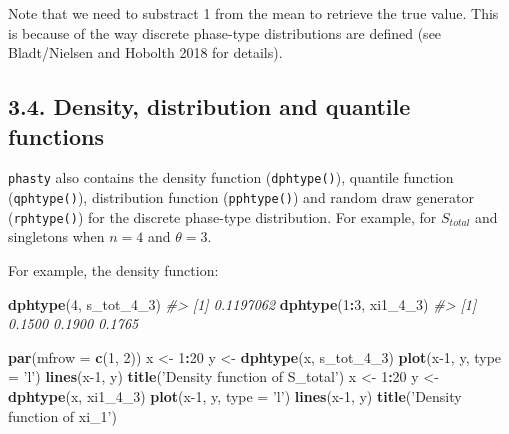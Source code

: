 \documentclass[]{article}
\newenvironment{Shaded}{\begin{snugshade}}{\end{snugshade}}
\newcommand{\CommentTok}[1]{\textcolor[rgb]{0.56,0.35,0.01}{\textit{#1}}}
\newcommand{\DataTypeTok}[1]{\textcolor[rgb]{0.13,0.29,0.53}{#1}}
\newcommand{\DecValTok}[1]{\textcolor[rgb]{0.00,0.00,0.81}{#1}}
\newcommand{\KeywordTok}[1]{\textcolor[rgb]{0.13,0.29,0.53}{\textbf{#1}}}
\newcommand{\NormalTok}[1]{#1}
\newcommand{\OperatorTok}[1]{\textcolor[rgb]{0.81,0.36,0.00}{\textbf{#1}}}
\newcommand{\StringTok}[1]{\textcolor[rgb]{0.31,0.60,0.02}{#1}}
\begin{document}
Note that we need to substract 1 from the mean to retrieve the true
value. This is because of the way discrete phase-type distributions are
defined (see Bladt/Nielsen and Hobolth 2018 for details).

\hypertarget{density-distribution-and-quantile-functions-1}{%
\subsection{3.4. Density, distribution and quantile
functions}\label{density-distribution-and-quantile-functions-1}}

\texttt{phasty} also contains the density function (\texttt{dphtype()}),
quantile function (\texttt{qphtype()}), distribution function
(\texttt{pphtype()}) and random draw generator (\texttt{rphtype()}) for
the discrete phase-type distribution. For example, for \(S_{total}\) and
singletons when \(n=4\) and \(\theta=3\).

For example, the density function:

\begin{Shaded}
\begin{Highlighting}[]
\KeywordTok{dphtype}\NormalTok{(}\DecValTok{4}\NormalTok{, s_tot_}\DecValTok{4}\NormalTok{_}\DecValTok{3}\NormalTok{)}
\CommentTok{#> [1] 0.1197062}
\KeywordTok{dphtype}\NormalTok{(}\DecValTok{1}\OperatorTok{:}\DecValTok{3}\NormalTok{, xi1_}\DecValTok{4}\NormalTok{_}\DecValTok{3}\NormalTok{)}
\CommentTok{#> [1] 0.1500 0.1900 0.1765}
\end{Highlighting}
\end{Shaded}

\begin{Shaded}
\begin{Highlighting}[]
\KeywordTok{par}\NormalTok{(}\DataTypeTok{mfrow =} \KeywordTok{c}\NormalTok{(}\DecValTok{1}\NormalTok{, }\DecValTok{2}\NormalTok{))}
\NormalTok{x <-}\StringTok{ }\DecValTok{1}\OperatorTok{:}\DecValTok{20}
\NormalTok{y <-}\StringTok{ }\KeywordTok{dphtype}\NormalTok{(x, s_tot_}\DecValTok{4}\NormalTok{_}\DecValTok{3}\NormalTok{)}
\KeywordTok{plot}\NormalTok{(x}\DecValTok{-1}\NormalTok{, y, }\DataTypeTok{type =} \StringTok{'l'}\NormalTok{)}
\KeywordTok{lines}\NormalTok{(x}\DecValTok{-1}\NormalTok{, y)}
\KeywordTok{title}\NormalTok{(}\StringTok{'Density function of S_total'}\NormalTok{)}
\NormalTok{x <-}\StringTok{ }\DecValTok{1}\OperatorTok{:}\DecValTok{20}
\NormalTok{y <-}\StringTok{ }\KeywordTok{dphtype}\NormalTok{(x, xi1_}\DecValTok{4}\NormalTok{_}\DecValTok{3}\NormalTok{)}
\KeywordTok{plot}\NormalTok{(x}\DecValTok{-1}\NormalTok{, y, }\DataTypeTok{type =} \StringTok{'l'}\NormalTok{)}
\KeywordTok{lines}\NormalTok{(x}\DecValTok{-1}\NormalTok{, y)}
\KeywordTok{title}\NormalTok{(}\StringTok{'Density function of xi_1'}\NormalTok{)}
\end{Highlighting}
\end{Shaded}
\end{document}
